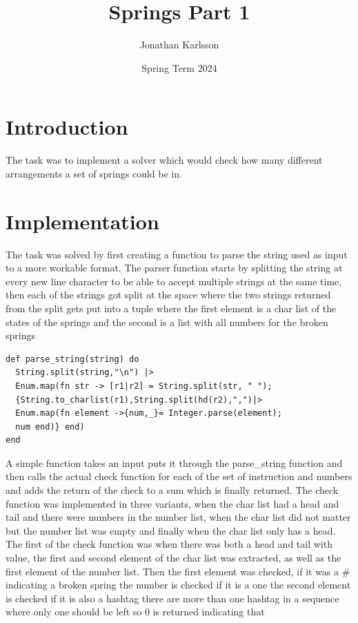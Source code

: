 \documentclass[a4paper,11pt]{article}
\begin{document}
\title{
    \textbf{Springs Part 1}
}
\author{Jonathan Karlsson}
\date{Spring Term 2024}

\maketitle

\section*{Introduction}
The task was to implement a solver which would check how many different arrangements a set of springs could be in.
\section*{Implementation}
The task was solved by first creating a function to parse the string used as input to a more workable format. The parser function starts by splitting the string at every new line character to be able to accept multiple strings at the same time, then each of the strings got split at the space where the two strings returned from the split gets put into a tuple where the first element is a char list of the states of the springs and the second is a list with all numbers for the broken springs 
\begin{verbatim}
def parse_string(string) do
  String.split(string,"\n") |>
  Enum.map(fn str -> [r1|r2] = String.split(str, " ");
  {String.to_charlist(r1),String.split(hd(r2),",")|>
  Enum.map(fn element ->{num,_}= Integer.parse(element);
  num end)} end)
end
\end{verbatim}
A simple function takes an input puts it through the parse\_string function and then calls the actual check function for each of the set of instruction and numbers and adds the return of the check to a sum which is finally returned. 
The check function was implemented in three variants, when the char list had a head and tail and there were numbers in the number list, when the char list did not matter but the number list was empty and finally when the char list only has a head. 
The first of the check function was when there was both a head and tail with value, the first and second element of the char list was extracted, as well as the first element of the number list. Then the first element was checked, if it was a \# indicating a broken spring the number is checked if it is a one the second element is checked if it is also a hashtag there are more than one hashtag in a sequence where only one should be left so 0 is returned indicating that 
\end{document}
